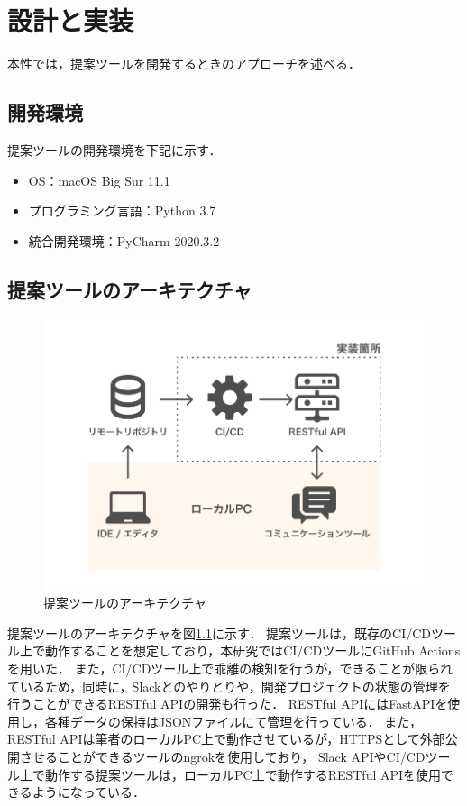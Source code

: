 \chapter{設計と実装}
本性では，提案ツールを開発するときのアプローチを述べる．

\section{開発環境}
提案ツールの開発環境を下記に示す．

\begin{itemize}
    \item OS：macOS Big Sur 11.1
    \item プログラミング言語：Python 3.7
    \item 統合開発環境：PyCharm 2020.3.2
\end{itemize}

\section{提案ツールのアーキテクチャ}
\label{toolartchitecture}

\begin{figure}[H]
    \centering
    \includegraphics[width=12cm]{images/architecture.png}
    \caption{提案ツールのアーキテクチャ}
    \label{architecture}
\end{figure}

提案ツールのアーキテクチャを図\ref{architecture}に示す．
提案ツールは，既存のCI/CDツール上で動作することを想定しており，本研究ではCI/CDツールにGitHub Actionsを用いた．
また，CI/CDツール上で乖離の検知を行うが，できることが限られているため，同時に，Slackとのやりとりや，開発プロジェクトの状態の管理を行うことができるRESTful APIの開発も行った．
RESTful APIにはFastAPIを使用し，各種データの保持はJSONファイルにて管理を行っている．
また，RESTful APIは筆者のローカルPC上で動作させているが，HTTPSとして外部公開させることができるツールのngrokを使用しており，
Slack APIやCI/CDツール上で動作する提案ツールは，ローカルPC上で動作するRESTful APIを使用できるようになっている．

